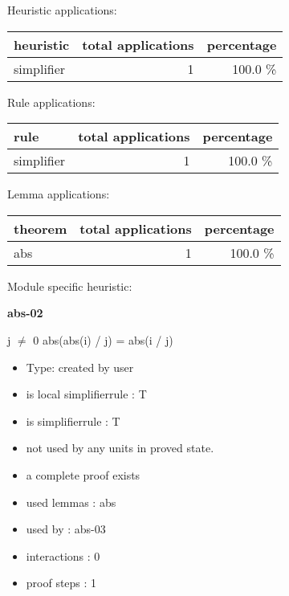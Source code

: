 \documentclass[a4paper]{article}
\begin{document}
\medskip


Heuristic applications:

\begin{supertabular}{l|r|r}
heuristic	& total applications & percentage \\ \hline
simplifier & 1 & 100.0 \% \\

\end{supertabular}

Rule applications:

\begin{supertabular}{l|r|r}
rule	        & total applications & percentage \\ \hline
simplifier & 1 & 100.0 \% \\

\end{supertabular}

Lemma applications:

\begin{supertabular}{l|r|r}
theorem	        & total applications & percentage \\ \hline
abs & 1 & 100.0 \% \\

\end{supertabular}

Module specific heuristic:

\pagebreak

{\LARGE\bf abs-02}\label{lemma-abs-02}

\medskip

j $\neq$ 0 \Fol abs(abs(i) / j) = abs(i / j)

\begin{itemize}

\item Type: created by user

\item is local simplifierrule : T
\item is simplifierrule : T
\item not used by any units in proved state.
\item       a complete proof exists
\item       used lemmas  : abs
\item       used by      : abs-03
\item       interactions : 0
\item       proof steps  : 1
\end{itemize}

\medskip
\end{document}
